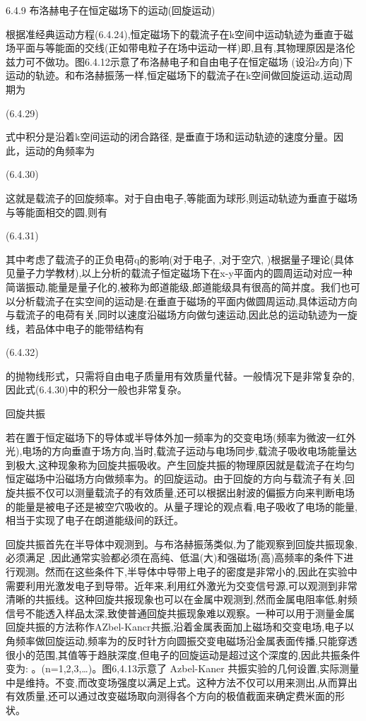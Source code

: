 6.4.9 布洛赫电子在恒定磁场下的运动(回旋运动)

根据准经典运动方程(6.4.24),恒定磁场下的载流子在k空间中运动轨迹为垂直于磁场平面与等能面的交线(正如带电粒子在场中运动一样)即,且有,其物理原因是洛伦兹力可不做功。图6.4.12示意了布洛赫电子和自由电子在恒定磁场 (设沿z方向)下运动的轨迹。和布洛赫振荡一样,恒定磁场下的载流子在k空间做回旋运动,运动周期为

 	(6.4.29)

式中积分是沿着k空间运动的闭合路径, 是垂直于场和运动轨迹的速度分量。因此，运动的角频率为

 	(6.4.30)

这就是载流子的回旋频率。对于自由电子,等能面为球形,则运动轨迹为垂直于磁场与等能面相交的圆,则有

 	(6.4.31)

其中考虑了载流子的正负电荷q的影响(对于电子, ,对于空穴, )根据量子理论(具体见量子力学教材),以上分析的载流子恒定磁场下在x-y平面内的圆周运动对应一种简谐振动,能量是量子化的,被称为郎道能级,郎道能级具有很高的简并度。我们也可以分析载流子在实空间的运动是:在垂直于磁场的平面内做圆周运动,具体运动方向与载流子的电荷有关,同时以速度沿磁场方向做匀速运动,因此总的运动轨迹为一旋线，若品体中电子的能带结构有

 	(6.4.32)

的抛物线形式，只需将自由电子质量用有效质量代替。一般情况下是非常复杂的,因此式(6.4.30)中的积分一般也非常复杂。





回旋共振

若在置于恒定磁场下的导体或半导体外加一频率为的交变电场(频率为微波一红外光),电场的方向垂直于场方向,当时,载流子运动与电场同步,载流子吸收电场能量达到极大,这种现象称为回旋共振吸收。产生回旋共振的物理原因就是载流子在均匀恒定磁场中沿磁场方向做频率为。的回旋运动。由于回旋的方向与载流子有关,回旋共振不仅可以测量载流子的有效质量,还可以根据出射波的偏振方向来判断电场的能量是被电子还是被空穴吸收的。从量子理论的观点看,电子吸收了电场的能量,相当于实现了电子在朗道能级间的跃迁。

回旋共振首先在半导体中观测到。与布洛赫振荡类似,为了能观察到回旋共振现象,必须满足 ,因此通常实验都必须在高纯、低温(大)和强磁场(高)高频率的条件下进行观测。然而在这些条件下,半导体中导带上电子的密度是非常小的,因此在实验中需要利用光激发电子到导带。近年来,利用红外激光为交变信号源,可以观测到非常清晰的共振线。这种回旋共报现象也可以在金属中观测到,然而金属电阻率低,射频信号不能透入样品太深,致使普通回旋共振现象难以观察。一种可以用于测量金属回旋共振的方法称作AZbel-Kancr共振,沿着金属表面加上磁场和交变电场,电子以角频率做回旋运动,频率为的反时针方向圆振交变电磁场沿金属表面传播,只能穿透很小的范围,其值等于趋肤深度,但电子的回旋运动是超过这个深度的,因此共振条件变为: 。(n=1,2,3,…)。图6,4.13示意了 Azbel-Kaner 共振实验的几何设置,实际测量中是维持。不变,而改变场强度以满足上式。这种方法不仅可以用来测出,从而算出有效质量,还可以通过改变磁场取向测得各个方向的极值截面来确定费米面的形状。



